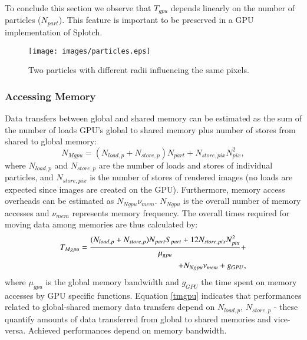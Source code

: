 \documentclass[1p]{elsarticle}
\begin{document}
To conclude this section we observe that $T_{gpu}$ depends linearly on the number of particles ($N_{part}$). This feature is important to be preserved in a GPU implementation of Splotch.

\begin{figure}
\centering
\texttt{[image: images/particles.eps]}
\caption{Two particles with different radii influencing the same pixels.}
\label{fig:particles}
\end{figure}


\subsubsection{Accessing Memory}
Data transfers between global and shared memory can be estimated 
as the sum of the number of loads 
GPU's global to shared memory plus number of stores from shared to global memory:
\begin{equation}
N_{Mgpu} = (N_{load,p} + N_{store,p}) N_{part} + N_{store,pix} N_{pix}^2,
\end{equation}
where $N_{load,p}$ and $N_{store,p}$ are the number of loads and stores of individual 
particles, and $N_{store,pix}$ is the number of stores of rendered images (no loads 
are expected since images are created on the GPU). 
Furthermore, memory access overheads can be estimated as $N_{Ngpu} \nu_{mem}$. $N_{Ngpu}$ is the overall number of memory accesses and $\nu_{mem}$ represents memory frequency. The overall times required for moving data among memories are thus calculated by:
\begin{equation}\label{tmgpu}
\begin{split}
T_{Mgpu} = {(N_{load,p} + N_{store,p}) N_{part} S_{part}
+ 12 N_{store,pix} N_{pix}^2\over \mu_{gpu}} + \\
+ N_{Ngpu} \nu_{mem} + g_{GPU},
\end{split}
\end{equation}
where $\mu_{gpu}$ is the global memory bandwidth
and $g_{GPU}$ the time 
spent on memory accesses by GPU specific functions. Equation \eqref{tmgpu} indicates that performances related to global-shared memory data transfers depend on $N_{load,p}$, $N_{store,p}$ - these quantify amounts of data transferred from global to shared memories and vice-versa. Achieved performances depend on memory bandwidth.
\end{document}
